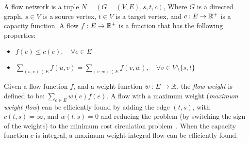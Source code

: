 A flow network is a tuple $N = (G = (V, E), s, t, c)$, 
Where $G$ is a directed graph, 
$s \in V$ is a source vertex, 
$t \in V$ is a target vertex, 
and $c : E \rightarrow \mathbb{R}^+$ is a capacity function. 
A flow $f : E \rightarrow \mathbb{R}^+$ is a function that has the following properties:
\begin{itemize}
\item
$f(e) \leq c(e), \quad \forall e \in E$

\item
$\sum_{(u, v) \in E} f(u, v) = \sum_{(v, w) \in E} f(v, w), \quad \forall v \in V \setminus \{s, t\}$
\end{itemize}

Given a flow function $f$, 
and a weight function $w: E \rightarrow \mathbb{R}$, 
the \emph{flow weight} is defined to be:
$\sum_{e \in E}{w(e)f(e)}$.
A flow with a maximum weight (\emph{maximum weight flow}) can be efficiently found by adding 
the edge $(t, s)$, with $c(t,s) = \infty$, and $w(t,s) = 0$ and reducing the problem
(by switching the sign of the weights) 
to the minimum cost circulation problem~\cite{tardos1985strongly}.
When the capacity function $c$ is integral, 
a maximum weight integral flow can be efficiently found.  
